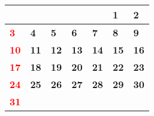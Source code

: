 \documentclass[a4paper,landscape]{jsarticle}
\newcommand{\dig}{\hspace{29mm}}
\newcommand{\tdig}{\hspace{27mm}}
\newcommand{\LBF}{\LARGE\textbf}
\begin{document}
\begingroup
\renewcommand{\arraystretch}{4}
\begin{tabular}{|p{32mm}|p{32mm}|p{32mm}|p{32mm}|p{32mm}|p{32mm}|p{32mm}|}
\hline
&&&&&\raisebox{30pt} {\dig\LBF{1}}&\raisebox{30pt} {\dig\LBF{2}}\\
\hline
\raisebox{30pt} {\dig\textcolor{red}{\LBF{3}}}&\raisebox{30pt} {\dig\LBF{4}}&\raisebox{30pt} {\dig\LBF{5}}&\raisebox{30pt} {\dig\LBF{6}}&\raisebox{30pt} {\dig\LBF{7}}&\raisebox{30pt} {\dig\LBF{8}}&\raisebox{30pt} {\dig\LBF{9}}\\
\hline
\raisebox{30pt} {\tdig\textcolor{red}{\LBF{10}}}&\raisebox{30pt} {\tdig\LBF{11}}&\raisebox{30pt} {\tdig\LBF{12}}&\raisebox{30pt} {\tdig\LBF{13}}&\raisebox{30pt} {\tdig\LBF{14}}&\raisebox{30pt} {\tdig\LBF{15}}&\raisebox{30pt} {\tdig\LBF{16}}\\
\hline
\raisebox{30pt} {\tdig\textcolor{red}{\LBF{17}}}&\raisebox{30pt} {\tdig\LBF{18}}&\raisebox{30pt} {\tdig\LBF{19}}&\raisebox{30pt} {\tdig\LBF{20}}&\raisebox{30pt} {\tdig\LBF{21}}&\raisebox{30pt} {\tdig\LBF{22}}&\raisebox{30pt} {\tdig\LBF{23}}\\
\hline
\raisebox{30pt} {\tdig\textcolor{red}{\LBF{24}}}&\raisebox{30pt} {\tdig\LBF{25}}&\raisebox{30pt} {\tdig\LBF{26}}&\raisebox{30pt} {\tdig\LBF{27}}&\raisebox{30pt} {\tdig\LBF{28}}&\raisebox{30pt} {\tdig\LBF{29}}&\raisebox{30pt} {\tdig\LBF{30}}\\
\hline
\raisebox{30pt} {\tdig\textcolor{red}{\LBF{31}}}&&&&&&\\
\hline
\end{tabular}
\endgroup
\end{document}
